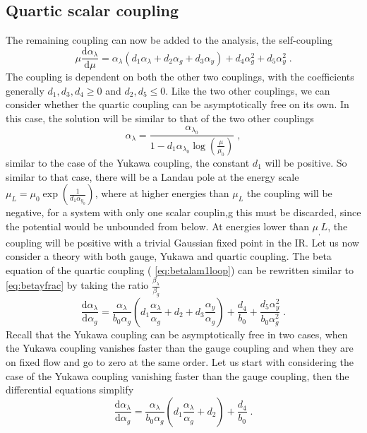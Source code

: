\subsection{Quartic scalar coupling}
The remaining coupling can now be added to the analysis, the self-coupling
\begin{equation}
    \mu \frac{\text{d} \alpha_\lambda}{\text{d}\mu}=\alpha_\lambda\left(d_1\alpha_\lambda + d_2\alpha_g+d_3\alpha_y\right)+d_4\alpha_g^2+d_5\alpha_y^2\;.
\end{equation}
The coupling is dependent on both the other two couplings, with the coefficients generally $d_1,d_3,d_4\ge0$ and $d_2,d_5\le 0$. Like the two other couplings, we can consider whether the quartic coupling can be asymptotically free on its own. In this case, the solution will be similar to that of the two other couplings
\begin{equation}
    \alpha_\lambda=\frac{\alpha_{\lambda_0}}{1-d_1 \alpha_{\lambda_0} \log \left(\frac{\mu}{\mu_0 }\right)}\;,
\end{equation}
similar to the case of the Yukawa coupling, the constant $d_1$ will be positive. So similar to that case, there will be a Landau pole at the energy scale $\mu_L=\mu_0\exp(\frac1{d_1\alpha_{y_0}})$, where at higher energies than $\mu_L$ the coupling will be negative, for a system with only one scalar couplin,g this must be discarded, since the potential would be unbounded from below. At energies lower than $\mu_,L$, the coupling will be positive with a trivial Gaussian fixed point in the IR. 
Let us now consider a theory with both gauge, Yukawa and quartic coupling. The beta equation of the quartic coupling ( \eqref{eq:betalam1loop}) can be rewritten similar to \eqref{eq:betayfrac} by taking the ratio $\frac{\beta_\lambda}{\beta_g}$
\begin{equation}
    \frac{\text{d} \alpha_\lambda}{\text{d}\alpha_g}=\frac{\alpha_\lambda}{b_0\alpha_g}\left(d_1\frac{\alpha_\lambda}{\alpha_g} + d_2+d_3\frac{\alpha_y}{\alpha_g}\right)+\frac{d_4}{b_0}+\frac{d_5\alpha_y^2}{b_0\alpha_g^2}\;.
\end{equation}
Recall that the Yukawa coupling can be asymptotically free in two cases, when the Yukawa coupling vanishes faster than the gauge coupling and when they are on fixed flow and go to zero at the same order. Let us start with considering the case of the Yukawa coupling vanishing faster than the gauge coupling, then the differential equations simplify
\begin{equation}
    \frac{\text{d} \alpha_\lambda}{\text{d}\alpha_g}=\frac{\alpha_\lambda}{b_0\alpha_g}\left(d_1\frac{\alpha_\lambda}{\alpha_g} + d_2\right)+\frac{d_4}{b_0}\;.
    \label{eq:betalamfrac}
\end{equation}
